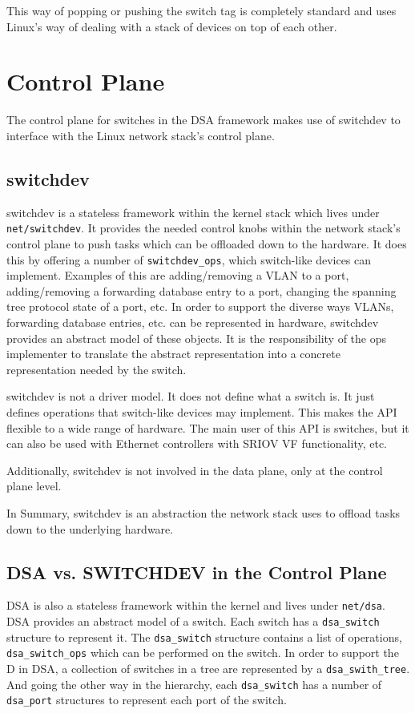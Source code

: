 \documentclass[letterpaper]{article}
\begin{document}
This way of popping or pushing the switch tag is completely standard
and uses Linux's way of dealing with a stack of devices on top of each
other.

\section{Control Plane}

The control plane for switches in the DSA framework makes use of
switchdev to interface with the Linux network stack's control plane.

\subsection{switchdev}

switchdev is a stateless framework within the kernel stack which lives
under \verb|net/switchdev|. It provides the needed control knobs
within the network stack's control plane to push tasks which can be
offloaded down to the hardware. It does this by offering a number of
\verb|switchdev_ops|, which switch-like devices can
implement. Examples of this are adding/removing a VLAN to a port,
adding/removing a forwarding database entry to a port, changing the spanning
tree protocol state of a port, etc. In order to support the diverse
ways VLANs, forwarding database entries, etc. can be represented in
hardware, switchdev provides an abstract model of these objects. It is
the responsibility of the ops implementer to translate the abstract
representation into a concrete representation needed by the switch.

switchdev is not a driver model. It does not define what a switch
is. It just defines operations that switch-like devices may
implement. This makes the API flexible to a wide range of
hardware. The main user of this API is switches, but it can also be
used with Ethernet controllers with SRIOV VF functionality, etc.

Additionally, switchdev is not involved in the data plane, only at the
control plane level.

In Summary, switchdev is an abstraction the network stack uses to
offload tasks down to the underlying hardware.

\subsection{DSA vs. SWITCHDEV in the Control Plane}

DSA is also a stateless framework within the kernel and lives under
\verb|net/dsa|. DSA provides an abstract model of a switch. Each
switch has a \verb|dsa_switch| structure to represent it. The
\verb|dsa_switch| structure contains a list of operations,
\verb|dsa_switch_ops| which can be performed on the switch. In order
to support the D in DSA, a collection of switches in a tree are
represented by a \verb|dsa_swith_tree|. And going the other way in the
hierarchy, each \verb|dsa_switch| has a number of \verb|dsa_port|
structures to represent each port of the switch.
\end{document}

